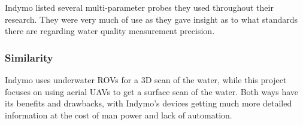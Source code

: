 Indymo listed several multi-parameter probes they used throughout their research. They were very much of use as they gave insight as to what standards there are regarding water quality measurement precision.

\subsubsection{Similarity}
Indymo uses underwater ROVs for a 3D scan of the water, while this project focuses on using aerial UAVs to get a surface scan of the water. Both ways have its benefits and drawbacks, with Indymo's devices getting much more detailed information at the cost of man power and lack of automation.

